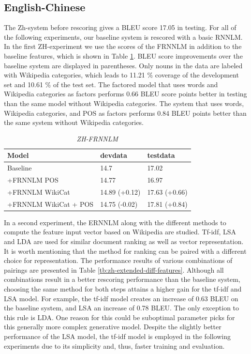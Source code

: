 \documentclass[a4paper]{article}
\begin{document}
\subsection{English-Chinese}
The Zh-system before rescoring gives a BLEU score 17.05 in testing. For all of the following experiments, our baseline system is rescored with a basic RNNLM.
In the first ZH-experiment we use the scores of the FRNNLM in addition to the baseline features, which is shown in Table \ref{tb:zh-factored}. BLEU score improvements over the baseline system are displayed in parentheses. Only nouns in the data are labeled with Wikipedia categories, which leads to 11.21 \% coverage of the development set and 10.61 \% of the test set. The factored model that uses words and Wikipedia categories as factors performs 0.66 BLEU score points better in testing than the same model without Wikipedia categories. The system that uses words, Wikipedia categories, and POS as factors performs 0.84 BLEU points better than the same system without Wikipedia categories.

\begin{table}
\caption{\it ZH-FRNNLM}
\vspace{2mm}
\centering
  \begin{tabular}{ lll }
  	\hline
  	Model                 & devdata       & testdata      \\ \hline\hline
  	Baseline              & 14.7          & 17.02         \\
  	+FRNNLM POS           & 14.77         & 16.97         \\ \hline
  	+FRNNLM WikiCat       & 14.89 (+0.12) & 17.63 (+0.66) \\
  	+FRNNLM WikiCat + POS & 14.75 (-0.02) & 17.81 (+0.84) \\ \hline
  \end{tabular}
  \label{tb:zh-factored}
\end{table}

In a second experiment, the ERNNLM along with the different methods to compute the feature input vector based on Wikipedia are studied. Tf-idf, LSA and LDA are used for similar document ranking as well as vector representation. It is worth mentioning that the method for ranking can be paired with a different choice for representation. The performance results of various combinations of pairings are presented in Table \ref{tb:zh-extended-diff-features}. Although all combinations result in a better rescoring performance than the baseline system, choosing the same method for both steps attains a higher gain for the tf-idf and LSA model. For example, the tf-idf model creates an increase of 0.63 BLEU on the baseline system, and LSA an increase of 0.78 BLEU. The only exception to this rule is LDA. One reason for this could be suboptimal parameter picks for this generally more complex generative model. Despite the slightly better performance of the LSA model, the tf-idf model is employed in the following experiments due to its simplicity and, thus, faster training and evaluation.
\end{document}

